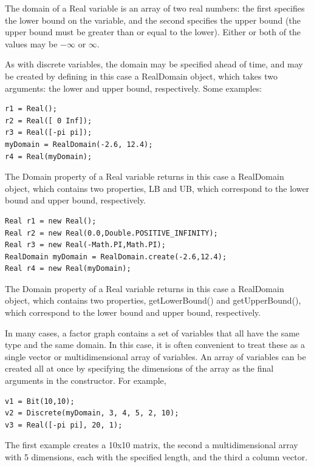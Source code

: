 The domain of a Real variable is an array of two real numbers: the first specifies the lower bound on the variable, and the second specifies the upper bound (the upper bound must be greater than or equal to the lower).  Either or both of the values may be $-\infty$ or $\infty$.

As with discrete variables, the domain may be specified ahead of time, and may be created by defining in this case a RealDomain object, which takes two arguments: the lower and upper bound, respectively.  Some examples:

\ifmatlab
\begin{lstlisting}
r1 = Real();
r2 = Real([ 0 Inf]);
r3 = Real([-pi pi]);
myDomain = RealDomain(-2.6, 12.4);
r4 = Real(myDomain);
\end{lstlisting}

The Domain property of a Real variable returns in this case a RealDomain object, which contains two properties, LB and UB, which correspond to the lower bound and upper bound, respectively.

\fi

\ifjava
\begin{lstlisting}
Real r1 = new Real();
Real r2 = new Real(0.0,Double.POSITIVE_INFINITY);
Real r3 = new Real(-Math.PI,Math.PI);
RealDomain myDomain = RealDomain.create(-2.6,12.4);
Real r4 = new Real(myDomain);
\end{lstlisting}

The Domain property of a Real variable returns in this case a RealDomain object, which contains two properties, getLowerBound() and getUpperBound(), which correspond to the lower bound and upper bound, respectively.
\fi

\ifmatlab


In many cases, a factor graph contains a set of variables that all have the same type and the same domain.  In this case, it is often convenient to treat these as a single vector or multidimensional array of variables.  An array of variables can be created all at once by specifying the dimensions of the array as the final arguments in the constructor.  For example,

\begin{lstlisting}
v1 = Bit(10,10);
v2 = Discrete(myDomain, 3, 4, 5, 2, 10);
v3 = Real([-pi pi], 20, 1);
\end{lstlisting}

The first example creates a 10x10 matrix, the second a multidimensional array with 5 dimensions, each with the specified length, and the third a column vector.

